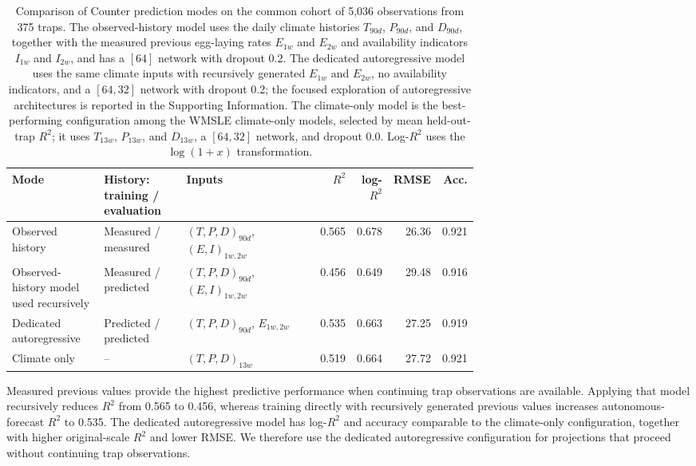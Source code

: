 \documentclass[preprint,12pt]{elsarticle}
\begin{document}
\begin{table}[htbp]
\centering
\small
\caption{Comparison of Counter prediction modes on the common cohort of 5,036 observations from 375 traps. The observed-history model uses the daily climate histories $T_{90d}$, $P_{90d}$, and $D_{90d}$, together with the measured previous egg-laying rates $E_{1w}$ and $E_{2w}$ and availability indicators $I_{1w}$ and $I_{2w}$, and has a $[64]$ network with dropout 0.2. The dedicated autoregressive model uses the same climate inputs with recursively generated $E_{1w}$ and $E_{2w}$, no availability indicators, and a $[64,32]$ network with dropout 0.2; the focused exploration of autoregressive architectures is reported in the Supporting Information. The climate-only model is the best-performing configuration among the WMSLE climate-only models, selected by mean held-out-trap $R^2$; it uses $T_{13w}$, $P_{13w}$, and $D_{13w}$, a $[64,32]$ network, and dropout 0.0. Log-$R^2$ uses the $\log(1+x)$ transformation.}
\label{tab:counter_modes}
{\setlength{\tabcolsep}{3pt}
\renewcommand{\arraystretch}{1.15}
\begin{tabular}{@{}>{\raggedright\arraybackslash}p{0.20\linewidth}>{\raggedright\arraybackslash}p{0.18\linewidth}>{\raggedright\arraybackslash}p{0.30\linewidth}rrrr@{}}
\toprule
Mode & History: training / evaluation & Inputs & $R^2$ & log-$R^2$ & RMSE & Acc. \\
\midrule
Observed history & Measured / measured & $(T,P,D)_{90d}$, $(E,I)_{1w,2w}$ & 0.565 & 0.678 & 26.36 & 0.921 \\
Observed-history model used recursively & Measured / predicted & $(T,P,D)_{90d}$, $(E,I)_{1w,2w}$ & 0.456 & 0.649 & 29.48 & 0.916 \\
Dedicated autoregressive & Predicted / predicted & $(T,P,D)_{90d}$, $E_{1w,2w}$ & 0.535 & 0.663 & 27.25 & 0.919 \\
Climate only & -- & $(T,P,D)_{13w}$ & 0.519 & 0.664 & 27.72 & 0.921 \\
\bottomrule
\end{tabular}}
\end{table}

Measured previous values provide the highest predictive performance when continuing trap observations are available. Applying that model recursively reduces $R^2$ from 0.565 to 0.456, whereas training directly with recursively generated previous values increases autonomous-forecast $R^2$ to 0.535. The dedicated autoregressive model has log-$R^2$ and accuracy comparable to the climate-only configuration, together with higher original-scale $R^2$ and lower RMSE. We therefore use the dedicated autoregressive configuration for projections that proceed without continuing trap observations.
\end{document}
